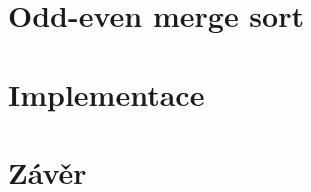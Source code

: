 \documentclass[a4paper, 12pt, titlepage]{article}
\begin{document}
\section{Odd-even merge sort}
\label{sec:odd_even_merge_sort}


\section{Implementace}
\label{sec:implementace}


\section{Závěr}
\label{sec:závěr}
\end{document}
